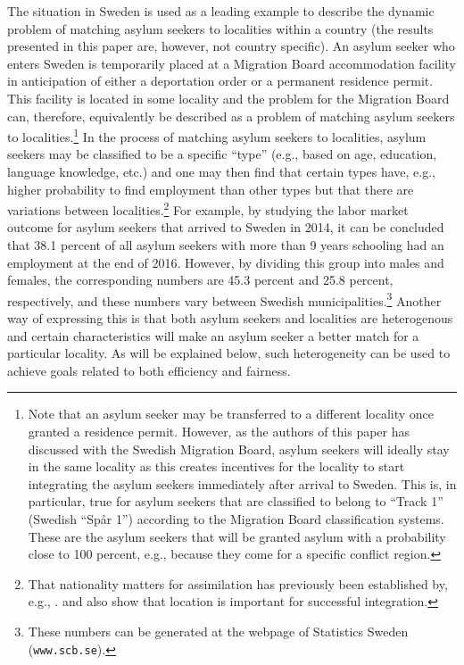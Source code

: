 \documentclass[12pt,fleqn]{article}
\begin{document}
The situation in Sweden is used as a leading example to describe the dynamic problem of matching asylum seekers to localities within a country (the results presented in this paper are, however, not country specific). An asylum seeker who enters Sweden is temporarily placed at a Migration Board accommodation facility in anticipation of either a deportation order or a permanent residence permit. This facility is located in some locality and the problem for the Migration Board can, therefore, equivalently be described as a problem of matching asylum seekers to localities.\footnote{Note that an asylum seeker may be transferred to a different locality once granted a residence permit. However, as the authors of this paper has discussed with the Swedish Migration Board, asylum seekers will ideally stay in the same locality as this creates incentives for the locality to start integrating the asylum seekers immediately after arrival to Sweden. This is, in particular, true for asylum seekers that are classified to belong to ``Track 1'' (Swedish ``Sp\aa r 1'') according to the Migration Board classification systems. These are the asylum seekers that will be granted asylum with a probability close to 100 percent, e.g., because they come for a specific conflict region.} In the process of matching asylum seekers to localities, asylum seekers may be classified to be a specific ``type'' (e.g., based on age, education, language knowledge, etc.) and one may then find that certain types have, e.g., higher probability to find employment than other types but that there are variations between localities.\footnote{That nationality matters for assimilation has previously been established by, e.g., \citet{bib:RanEtAl}. \citet{bib:EdinEtAl} and \citet{bib:Damm} also show that location is important for successful integration.} For example, by studying the labor market outcome for asylum seekers that arrived to Sweden in 2014, it can be concluded that 38.1 percent of all asylum seekers with more than 9 years schooling had an employment at the end of 2016. However, by dividing this group into males and females, the corresponding numbers are 45.3 percent and 25.8 percent, respectively, and these numbers vary between Swedish municipalities.\footnote{These numbers can be generated at the webpage of Statistics Sweden (\texttt{www.scb.se}).} Another way of expressing this is that both asylum seekers and localities are heterogenous and certain characteristics will make an asylum seeker a better match for a particular locality. As will be explained below, such heterogeneity can be used to achieve goals related to both efficiency and fairness.
\end{document}
